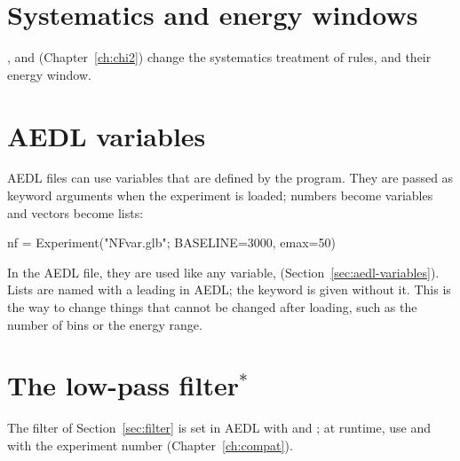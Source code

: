 \section{Systematics and energy windows}

,  and 
(Chapter~\ref{ch:chi2}) change the systematics treatment of rules, and
 their energy window.

\section{AEDL variables}

AEDL files can use variables that are defined by the program. They are passed
as keyword arguments when the experiment is loaded; numbers become variables
and vectors become lists:
\begin{julia}
nf = Experiment("NFvar.glb"; BASELINE=3000, emax=50)
\end{julia}
In the AEDL file, they are used like any variable,
 (Section~\ref{sec:aedl-variables}). Lists are
named with a leading \code{\%} in AEDL; the keyword is given without it.
This is the way to change things that cannot be changed after loading, such
as the number of bins or the energy range.

\section{The low-pass filter\texorpdfstring{$^\ast$}{*}}

The filter of Section~\ref{sec:filter} is set in AEDL with
 and ; at runtime, use
 and
 with the experiment number
 (Chapter~\ref{ch:compat}).
